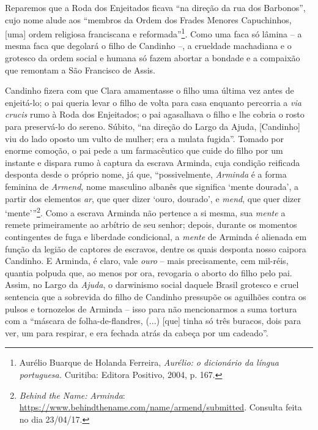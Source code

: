 Reparemos que a Roda dos Enjeitados ficava ``na direção da rua dos
Barbonos'', cujo nome alude aos ``membros da Ordem dos Frades Menores
Capuchinhos, {[}uma{]} ordem religiosa franciscana e
reformada''\footnote{Aurélio Buarque de Holanda Ferreira, \emph{Aurélio:
  o dicionário da língua portuguesa.} Curitiba: Editora Positivo, 2004,
  p. 167.}. Como uma faca só lâmina -- a mesma faca que degolará o filho
de Candinho --, a crueldade machadiana e o grotesco da ordem social e
humana só fazem abortar a bondade e a compaixão que remontam a São
Francisco de Assis.

Candinho fizera com que Clara amamentasse o filho uma última vez antes
de enjeitá-lo; o pai queria levar o filho de volta para casa enquanto
percorria a \emph{via crucis} rumo à Roda dos Enjeitados; o pai
agasalhava o filho e lhe cobria o rosto para preservá-lo do sereno.
Súbito, ``na direção do Largo da Ajuda, {[}Candinho{]} viu do lado
oposto um vulto de mulher; era a mulata fugida''. Tomado por enorme
comoção, o pai pede a um farmacêutico que cuide do filho por um instante
e dispara rumo à captura da escrava Arminda, cuja condição reificada
desponta desde o próprio nome, já que, ``possivelmente, \emph{Arminda} é
a forma feminina de \emph{Armend}, nome masculino albanês que significa
`mente dourada', a partir dos elementos \emph{ar}, que quer dizer `ouro,
dourado', e \emph{mend}, que quer dizer `mente'''\footnote{\emph{Behind
  the Name:} \emph{Arminda}:
  \href{https://www.behindthename.com/name/armend/submitted}{{https://www.behindthename.com/name/armend/submitted}}.
  Consulta feita no dia 23/04/17.}. Como a escrava Arminda não pertence
a si mesma, sua \emph{mente} a remete primeiramente ao arbítrio de seu
senhor; depois, durante os momentos contingentes de fuga e liberdade
condicional, a \emph{mente} de Arminda é alienada em função da legião de
captores de escravos, dentre os quais desponta nosso caipora Candinho. E
Arminda, é claro, vale \emph{ouro} -- mais precisamente, cem mil-réis,
quantia polpuda que, ao menos por ora, revogaria o aborto do filho pelo
pai. Assim, no Largo da \emph{Ajuda}, o darwinismo social daquele Brasil
grotesco e cruel sentencia que a sobrevida do filho de Candinho
pressupõe os aguilhões contra os pulsos e tornozelos de Arminda -- isso
para não mencionarmos a suma tortura com a ``máscara de
folha-de-flandres, (...) {[}que{]} tinha só três buracos, dois para ver,
um para respirar, e era fechada atrás da cabeça por um cadeado''.

